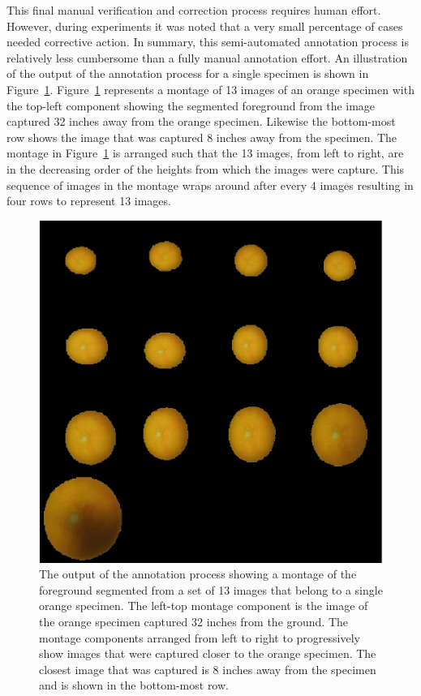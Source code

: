\documentclass {udthesis}
\begin{document}
This final manual verification and correction process requires human effort. However, during experiments it was noted that a very small percentage of cases needed corrective action. In summary, this semi-automated annotation process is relatively less cumbersome than a fully manual annotation effort. An illustration of the output of the annotation process for a single specimen is shown in Figure~\ref{fig:orange_segment_height_montage}. Figure~\ref{fig:orange_segment_height_montage} represents a montage of 13 images of an orange specimen with the top-left component showing the segmented foreground from the image captured 32 inches away from the orange specimen. Likewise the bottom-most row shows the image that was captured 8 inches away from the specimen. The montage in Figure~\ref{fig:orange_segment_height_montage} is arranged such that the 13 images, from left to right, are in the decreasing order of the heights from which the images were capture. This sequence of images in the montage wraps around after 
every 4 images resulting in four rows to represent 13 images.
%
\begin{figure}
  \centering
  \includegraphics[width=\textwidth]{orange_height_segment_montage}
  \caption[Annotation output for a single specimen]{The output of the annotation process showing a montage of the foreground segmented from a set of 13 images that belong to a single orange specimen. The left-top montage component is the image of the orange specimen captured 32 inches from the ground. The montage components arranged from left to right to progressively show images that were captured closer to the orange specimen. The closest image that was captured is 8 inches away from the specimen and is shown in the bottom-most row.} 
  \label{fig:orange_segment_height_montage}
\end{figure}	
%
\end{document}
